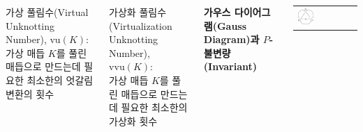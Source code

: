\documentclass[25pt, a0paper, portrait, margin=0mm, innermargin=15mm,
     blockverticalspace=15mm, colspace=15mm, subcolspace=8mm]{tikzposter}
\def\mysection#1{\textbf{\Large\color{NTNUBlue}\sf #1}\par}
\def\myem#1{\textsf{\color{BrickRed}#1}}
\begin{document}
\begin{columns}
{\myem{가상 풀림수(Virtual Unknotting Number)}, \myem{$\mathrm{vu}(K)$}:\\
\hspace*{2em}가상 매듭 $K$를 풀린 매듭으로 만드는데 필요한 최소한의 엇갈림 변환의 횟수

\myem{가상화 풀림수(Virtualization Unknotting Number)}, \myem{$\mathrm{vvu}(K)$}:\\
\hspace*{2em}가상 매듭 $K$를 풀린 매듭으로 만드는데 필요한 최소한의 가상화 횟수


\bigskip\bigskip
\mysection{가우스 다이어그램(Gauss Diagram)과 $P$-불변량(Invariant)}
\bigskip
\begin{center}
\begin{tabu} to .9\linewidth{X[2,m,c] X[.5,m,c] X[3,m,c] X[.5,m,c] X[4,m,c] }
\includegraphics[width=\linewidth]{gauss1}
 &  & 

\end{tabu}
\end{center}}
\end{columns}
\end{document}

